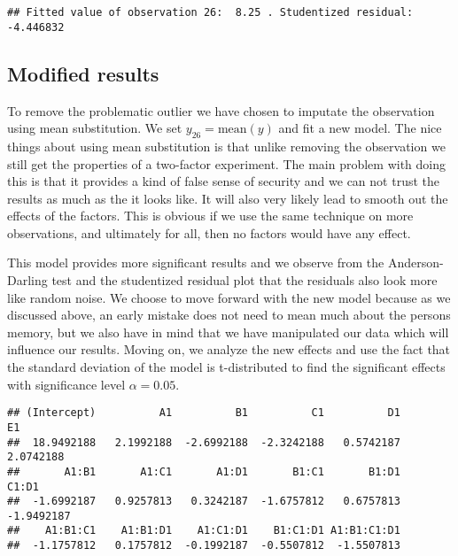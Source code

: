 \documentclass[]{article}
\newenvironment{Shaded}{\begin{snugshade}}{\end{snugshade}}
\newcommand{\DecValTok}[1]{\textcolor[rgb]{0.00,0.00,0.81}{#1}}
\newcommand{\StringTok}[1]{\textcolor[rgb]{0.31,0.60,0.02}{#1}}
\newcommand{\OperatorTok}[1]{\textcolor[rgb]{0.81,0.36,0.00}{\textbf{#1}}}
\newcommand{\NormalTok}[1]{#1}
\begin{document}
\begin{verbatim}
## Fitted value of observation 26:  8.25 . Studentized residual:  -4.446832
\end{verbatim}

\subsection{Modified results}\label{modified-results}

To remove the problematic outlier we have chosen to imputate the
observation using mean substitution. We set \(y_{26}=\text{mean}(y)\)
and fit a new model. The nice things about using mean substitution is
that unlike removing the observation we still get the properties of a
two-factor experiment. The main problem with doing this is that it
provides a kind of false sense of security and we can not trust the
results as much as the it looks like. It will also very likely lead to
smooth out the effects of the factors. This is obvious if we use the
same technique on more observations, and ultimately for all, then no
factors would have any effect.

This model provides more significant results and we observe from the
Anderson-Darling test and the studentized residual plot that the
residuals also look more like random noise. We choose to move forward
with the new model because as we discussed above, an early mistake does
not need to mean much about the persons memory, but we also have in mind
that we have manipulated our data which will influence our results.
Moving on, we analyze the new effects and use the fact that the standard
deviation of the model is t-distributed to find the significant effects
with significance level \(\alpha = 0.05\).

\begin{Shaded}
\end{Shaded}

\begin{verbatim}
## (Intercept)          A1          B1          C1          D1          E1 
##  18.9492188   2.1992188  -2.6992188  -2.3242188   0.5742187   2.0742188 
##       A1:B1       A1:C1       A1:D1       B1:C1       B1:D1       C1:D1 
##  -1.6992187   0.9257813   0.3242187  -1.6757812   0.6757813  -1.9492187 
##    A1:B1:C1    A1:B1:D1    A1:C1:D1    B1:C1:D1 A1:B1:C1:D1 
##  -1.1757812   0.1757812  -0.1992187  -0.5507812  -1.5507813
\end{verbatim}
\end{document}

